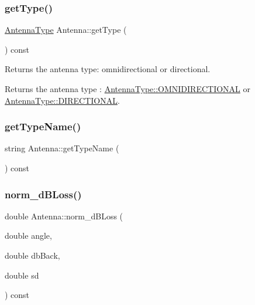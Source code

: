 \mbox{\label{class_antenna_adf45a8b339956741bf8dcb5361f5f249}} 
\subsubsection{\texorpdfstring{get\+Type()}{getType()}}
{\footnotesize\ttfamily \hyperlink{_antenna_type_8h_a7b678b5cb9dedc607131200119d96b16}{Antenna\+Type} Antenna\+::get\+Type (\begin{DoxyParamCaption}{ }\end{DoxyParamCaption}) const}

Returns the antenna type\+: omnidirectional or directional. \begin{DoxyReturn}{Returns}
the antenna type \+: \hyperlink{_antenna_type_8h_a7b678b5cb9dedc607131200119d96b16a8ff57fa72952e98025e600a041b8b8de}{Antenna\+Type\+::\+O\+M\+N\+I\+D\+I\+R\+E\+C\+T\+I\+O\+N\+AL} or \hyperlink{_antenna_type_8h_a7b678b5cb9dedc607131200119d96b16ab6f2249394a4def60a78b342dcc925b9}{Antenna\+Type\+::\+D\+I\+R\+E\+C\+T\+I\+O\+N\+AL}. 
\end{DoxyReturn}
\mbox{\label{class_antenna_a40941201e4b272c4b9593e05aa1ac38e}} 
\subsubsection{\texorpdfstring{get\+Type\+Name()}{getTypeName()}}
{\footnotesize\ttfamily string Antenna\+::get\+Type\+Name (\begin{DoxyParamCaption}{ }\end{DoxyParamCaption}) const\hspace{0.3cm}{\ttfamily [private]}}

\mbox{\label{class_antenna_a8270b1a03b61af1e048650e00a129b93}} 
\subsubsection{\texorpdfstring{norm\+\_\+d\+B\+Loss()}{norm\_dBLoss()}}
{\footnotesize\ttfamily double Antenna\+::norm\+\_\+d\+B\+Loss (\begin{DoxyParamCaption}\item[{double}]{angle,  }\item[{double}]{db\+Back,  }\item[{double}]{sd }\end{DoxyParamCaption}) const\hspace{0.3cm}{\ttfamily [private]}}

